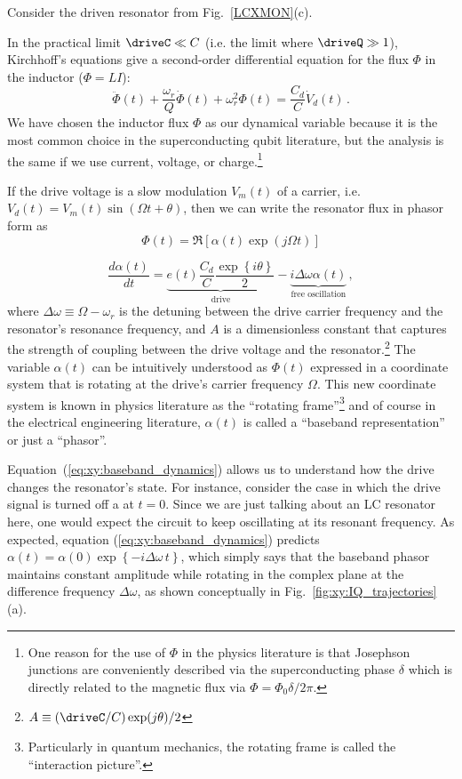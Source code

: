 Consider the driven resonator from Fig.~\ref{LCXMON}(c).

In the practical limit $\driveC \ll C$ (i.e. the limit where $\driveQ \gg 1$), Kirchhoff's equations give a second-order differential equation for the flux $\Phi$ in the inductor ($\Phi = LI$):
\begin{equation}
  \ddot{\Phi}(t) + \frac{\omega_r}{Q} \dot{\Phi}(t) + \omega_r^2 \Phi(t)
  = \frac{C_d}{C} \dot{V}_d(t) \, .
\end{equation}
We have chosen the inductor flux $\Phi$ as our dynamical variable because it is the most common choice in the superconducting qubit literature, but the analysis is the same if we use current, voltage, or charge.\footnote{One reason for the use of $\Phi$ in the physics literature is that Josephson junctions are conveniently described via the superconducting phase $\delta$ which is directly related to the magnetic flux via $\Phi = \Phi_0 \delta / 2\pi$.}

If the drive voltage is a slow modulation $V_m(t)$ of a carrier, i.e. $V_d(t) = V_m(t) \sin(\Omega t + \theta)$, then we can write the resonator flux in phasor form as
\begin{equation}
  \Phi(t) = \Re \left[ \alpha(t) \exp(j \Omega t) \right]
\end{equation}

\begin{equation}
  \frac{d\alpha (t)}{dt}
  = \underbrace{e(t)\frac{C_d}{C} \frac{\exp \left\{ i\theta\right\} }{2}}_\text{drive}
 - \underbrace{i \Delta \omega \alpha (t)}_\text{free oscillation} \, ,
\end{equation}
where $\Delta \omega \equiv \Omega - \omega_r$ is the detuning between the drive carrier frequency and the resonator's resonance frequency, and $A$ is a dimensionless constant that captures the strength of coupling between the drive voltage and the resonator.\footnote{$A \equiv (\driveC / C) \exp(j \theta)/2$}
The variable $\alpha(t)$ can be intuitively understood as $\Phi(t)$ expressed in a coordinate system that is rotating at the drive's carrier frequency $\Omega$.
This new coordinate system is known in physics literature as the ``rotating frame''\footnote{Particularly in quantum mechanics, the rotating frame is called the ``interaction picture''.} and of course in the electrical engineering literature, $\alpha(t)$ is called a ``baseband representation'' or just a ``phasor''.

Equation~(\ref{eq:xy:baseband_dynamics}) allows us to understand how the drive changes the resonator's state.
For instance, consider the case in which the drive signal is turned off a at $t=0$.
Since we are just talking about an LC resonator here, one would expect the circuit to keep oscillating at its resonant frequency. As expected, equation (\ref{eq:xy:baseband_dynamics}) predicts $\alpha(t) = \alpha (0) \exp \left\{-i \Delta\omega \, t \right\}$, which simply says that the baseband phasor maintains constant amplitude while rotating in the complex plane at the difference frequency $\Delta\omega$, as shown conceptually in Fig.~\ref{fig:xy:IQ_trajectories}(a).

